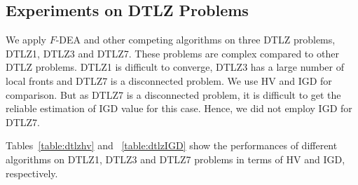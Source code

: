 \documentclass[review]{elsarticle}
\begin{document}
%




\subsection{Experiments on DTLZ Problems}
We apply $F$-DEA and other competing algorithms on three DTLZ problems, DTLZ1, DTLZ3 and DTLZ7. These problems are complex compared to other DTLZ problems.  DTLZ1 is difficult to converge, DTLZ3 has a large number of local fronts and DTLZ7 is a disconnected problem. 
We use HV and IGD for comparison. But as DTLZ7 is a disconnected problem, it is difficult to get the reliable estimation of IGD value for this case. Hence, we did not employ IGD  for DTLZ7.  %


Tables~\ref{table:dtlzhv} and ~\ref{table:dtlzIGD} show the performances of different algorithms on DTLZ1, DTLZ3 and DTLZ7 problems in terms of HV and IGD, respectively. %

%
\end{document}
